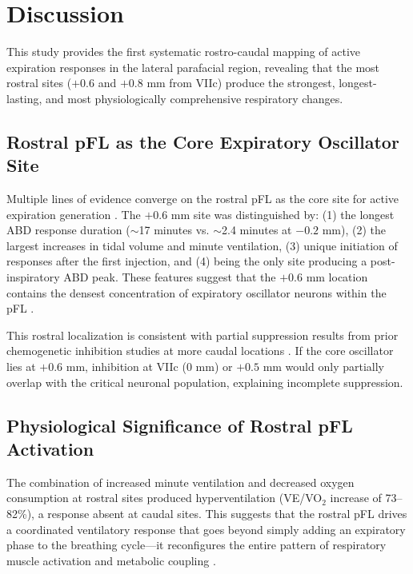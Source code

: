 \documentclass[12pt]{article}
\begin{document}
\section{Discussion}

This study provides the first systematic rostro-caudal mapping of active expiration responses in the lateral parafacial region, revealing that the most rostral sites ($+0.6$ and $+0.8$ mm from VIIc) produce the strongest, longest-lasting, and most physiologically comprehensive respiratory changes.

\subsection{Rostral pFL as the Core Expiratory Oscillator Site}

Multiple lines of evidence converge on the rostral pFL as the core site for active expiration generation \citep{feldman2013breathing, janczewski2006role}. The $+0.6$ mm site was distinguished by: (1) the longest ABD response duration ($\sim$17 minutes vs. $\sim$2.4 minutes at $-0.2$ mm), (2) the largest increases in tidal volume and minute ventilation, (3) unique initiation of responses after the first injection, and (4) being the only site producing a post-inspiratory ABD peak. These features suggest that the $+0.6$ mm location contains the densest concentration of expiratory oscillator neurons within the pFL \citep{pagliardini2011active, huckstepp2015pfl}.

This rostral localization is consistent with partial suppression results from prior chemogenetic inhibition studies at more caudal locations \citep{silva2016inhibition, anderson2016pfl}. If the core oscillator lies at $+0.6$ mm, inhibition at VIIc ($0$ mm) or $+0.5$ mm would only partially overlap with the critical neuronal population, explaining incomplete suppression.

\subsection{Physiological Significance of Rostral pFL Activation}

The combination of increased minute ventilation and decreased oxygen consumption at rostral sites produced hyperventilation (VE/VO$_2$ increase of 73--82\%), a response absent at caudal sites. This suggests that the rostral pFL drives a coordinated ventilatory response that goes beyond simply adding an expiratory phase to the breathing cycle---it reconfigures the entire pattern of respiratory muscle activation and metabolic coupling \citep{abdala2009abdominal, deruyver2017pfl}.
\end{document}
